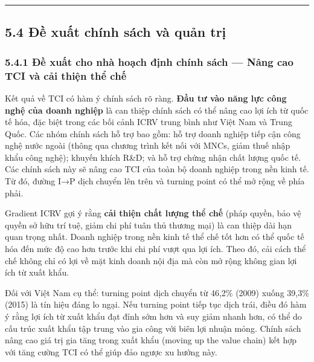 \documentclass[12pt,a4paper]{article}
\begin{document}
\begin{center}\rule{0.5\linewidth}{0.5pt}\end{center}

\hypertarget{54-ux111ux1ec1-xuux1ea5t-chuxednh-suxe1ch-vuxe0-quux1ea3n-trux1ecb}{%
\subsection{5.4 Đề xuất chính sách và quản
trị}\label{54-ux111ux1ec1-xuux1ea5t-chuxednh-suxe1ch-vuxe0-quux1ea3n-trux1ecb}}

\hypertarget{541-ux111ux1ec1-xuux1ea5t-cho-nhuxe0-houx1ea1ch-ux111ux1ecbnh-chuxednh-suxe1ch--nuxe2ng-cao-tci-vuxe0-cux1ea3i-thiux1ec7n-thux1ec3-chux1ebf}{%
\subsubsection{5.4.1 Đề xuất cho nhà hoạch định chính sách --- Nâng cao
TCI và cải thiện thể
chế}\label{541-ux111ux1ec1-xuux1ea5t-cho-nhuxe0-houx1ea1ch-ux111ux1ecbnh-chuxednh-suxe1ch--nuxe2ng-cao-tci-vuxe0-cux1ea3i-thiux1ec7n-thux1ec3-chux1ebf}}

Kết quả về TCI có hàm ý chính sách rõ ràng. \textbf{Đầu tư vào năng lực
công nghệ của doanh nghiệp} là can thiệp chính sách có thể nâng cao lợi
ích từ quốc tế hóa, đặc biệt trong các bối cảnh ICRV trung bình như Việt
Nam và Trung Quốc. Các nhóm chính sách hỗ trợ bao gồm: hỗ trợ doanh
nghiệp tiếp cận công nghệ nước ngoài (thông qua chương trình kết nối với
MNCs, giảm thuế nhập khẩu công nghệ); khuyến khích R\&D; và hỗ trợ chứng
nhận chất lượng quốc tế. Các chính sách này sẽ nâng cao TCI của toàn bộ
doanh nghiệp trong nền kinh tế. Từ đó, đường I→P dịch chuyển lên trên và
turning point có thể mở rộng về phía phải.

Gradient ICRV gợi ý rằng \textbf{cải thiện chất lượng thể chế} (pháp
quyền, bảo vệ quyền sở hữu trí tuệ, giảm chi phí tuân thủ thương mại) là
can thiệp dài hạn quan trọng nhất. Doanh nghiệp trong nền kinh tế thể
chế tốt hơn có thể quốc tế hóa đến mức độ cao hơn trước khi chi phí vượt
qua lợi ích. Theo đó, cải cách thể chế không chỉ có lợi về mặt kinh
doanh nội địa mà còn mở rộng không gian lợi ích từ xuất khẩu.

Đối với Việt Nam cụ thể: turning point dịch chuyển từ 46,2\% (2009)
xuống 39,3\% (2015) là tín hiệu đáng lo ngại. Nếu turning point tiếp tục
dịch trái, điều đó hàm ý rằng lợi ích từ xuất khẩu đạt đỉnh sớm hơn và
suy giảm nhanh hơn, có thể do cấu trúc xuất khẩu tập trung vào gia công
với biên lợi nhuận mỏng. Chính sách nâng cao giá trị gia tăng trong xuất
khẩu (moving up the value chain) kết hợp với tăng cường TCI có thể giúp
đảo ngược xu hướng này.
\end{document}
